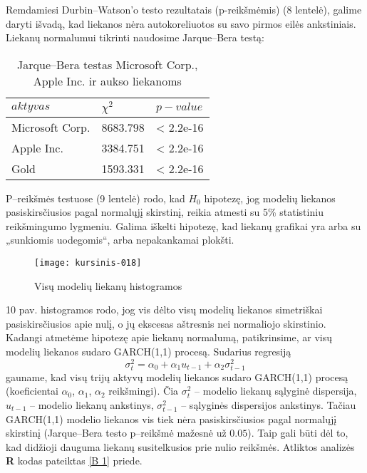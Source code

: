 \documentclass[12pt, a14paper, lithuanian]{article}
\begin{document}
Remdamiesi Durbin--Watson'o testo rezultatais (p-reikšmėmis) (8 lentelė), galime daryti išvadą, kad liekanos nėra autokoreliuotos su savo pirmos eilės ankstiniais.\\

Liekanų normalumui tikrinti naudosime Jarque--Bera testą:



\begin{table}[ht]
\begin{center}
    \begin{tabular}{ | l | l | l | }
    \hline
    $ aktyvas $ &  $ \chi^2 $  & $ p-value $  \\
    \hline
	Microsoft Corp. & 8683.798 & < 2.2e-16\\
	Apple Inc. & 3384.751 & < 2.2e-16\\
	Gold & 1593.331 & < 2.2e-16\\
	\hline
    \end{tabular}
\end{center}
\caption{Jarque--Bera testas Microsoft Corp., Apple Inc. ir aukso liekanoms}
\end{table}

P--reikšmės testuose (9 lentelė) rodo, kad $H_0$ hipotezę, jog modelių liekanos pasiskirsčiusios pagal normalųjį skirstinį, reikia atmesti su 5\% statistiniu reikšmingumo lygmeniu. Galima iškelti hipotezę, kad liekanų grafikai yra arba su „sunkiomis uodegomis“, arba nepakankamai plokšti. 

\begin{figure}[H]
  \centering
\texttt{[image: kursinis-018]}
  \caption{Visų modelių liekanų histogramos}
  \label{fig:10}
\end{figure}

10 pav. histogramos rodo, jog vis dėlto visų modelių liekanos simetriškai pasiskirsčiusios apie nulį, o jų ekscesas aštresnis nei normaliojo skirstinio.\\

Kadangi atmetėme hipotezę apie liekanų normalumą, patikrinsime, ar visų modelių liekanos sudaro GARCH(1,1) procesą\cite{Brook}. Sudarius regresiją $$\sigma_t^2 = \alpha_0 + \alpha_1 u_{t-1} + \alpha_2  \sigma^2_{t-1} $$ gauname, kad visų trijų aktyvų modelių liekanos sudaro GARCH(1,1) procesą (koeficientai $\alpha_0$, $\alpha_1$, $\alpha_2$ reikšmingi). Čia $\sigma_t^2$ -- modelio liekanų sąlyginė dispersija, $u_{t-1}$ -- modelio liekanų ankstinys, $\sigma^2_{t-1}$ -- sąlyginės dispersijos ankstinys. Tačiau GARCH(1,1) modelio liekanos vis tiek nėra pasiskirsčiusios pagal normalųjį skirstinį (Jarque--Bera testo p--reikšmė mažesnė už $0.05$). Taip gali būti dėl to, kad didžioji dauguma liekanų susitelkusios prie nulio reikšmės. Atliktos analizės \textbf{R} kodas pateiktas \ref{B 1} priede.
\end{document}
